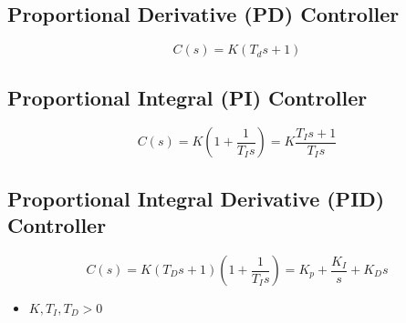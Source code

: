 \subsection{Proportional Derivative (PD) Controller}
\begin{definition}
    \begin{equation}
        C(s) = K(T_d s + 1)
    \end{equation}
\end{definition}

\subsection{Proportional Integral (PI) Controller}
\begin{definition}
    \begin{equation}
        C(s) = K \left(1 + \frac{1}{T_I s}\right) = K \frac{T_I s + 1}{T_I s}
    \end{equation}
\end{definition}

\subsection{Proportional Integral Derivative (PID) Controller}
\begin{definition}
    \begin{equation}
        C(s) = K(T_D s + 1)\left(1 + \frac{1}{T_I s}\right) = K_p + \frac{K_I}{s} + K_D s
    \end{equation}
    \begin{itemize}
        \item $K,T_I,T_D >0$ 
    \end{itemize}
\end{definition}

